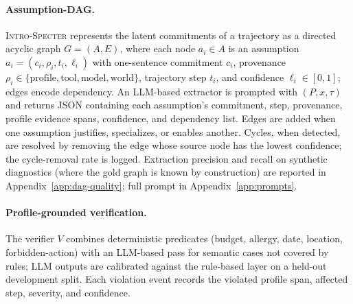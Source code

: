 \documentclass{article}
\newcommand{\method}{\textsc{Intro-Specter}\xspace}
\begin{document}
\paragraph{Assumption-DAG.} \method represents the latent commitments of a trajectory as a directed acyclic graph $G = (A, E)$, where each node $a_i \in A$ is an assumption $a_i = (c_i, \rho_i, t_i, \ell_i)$ with one-sentence commitment $c_i$, provenance $\rho_i \in \{\text{profile}, \text{tool}, \text{model}, \text{world}\}$, trajectory step $t_i$, and confidence $\ell_i \in [0,1]$; edges encode dependency. An LLM-based extractor is prompted with $(P, x, \tau)$ and returns JSON containing each assumption's commitment, step, provenance, profile evidence spans, confidence, and dependency list. Edges are added when one assumption justifies, specializes, or enables another. Cycles, when detected, are resolved by removing the edge whose source node has the lowest confidence; the cycle-removal rate is logged. Extraction precision and recall on synthetic diagnostics (where the gold graph is known by construction) are reported in Appendix~\ref{app:dag-quality}; full prompt in Appendix~\ref{app:prompts}.

\paragraph{Profile-grounded verification.}\label{sec:verifier} The verifier $V$ combines deterministic predicates (budget, allergy, date, location, forbidden-action) with an LLM-based pass for semantic cases not covered by rules; LLM outputs are calibrated against the rule-based layer on a held-out development split. Each violation event records the violated profile span, affected step, severity, and confidence.
\end{document}
